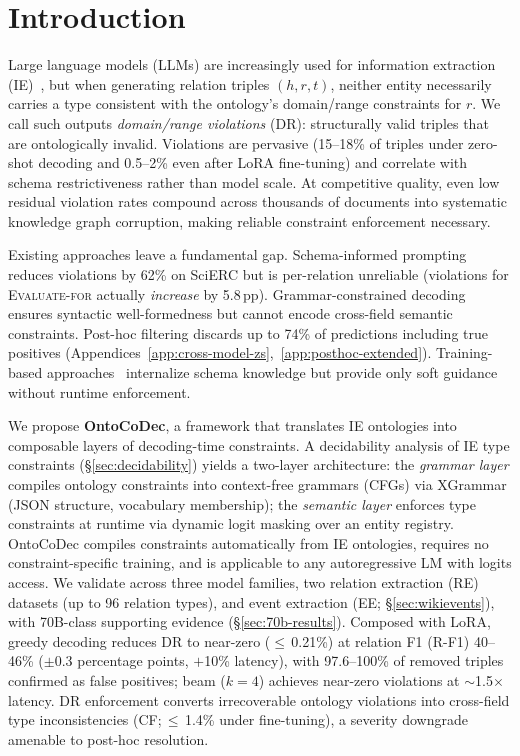 
\section{Introduction}
\label{sec:introduction}

Large language models (LLMs) are increasingly used for information extraction (IE)~\cite{li2023codeie,sainz2024gollie,wei2023zeroshot}, but when generating relation triples $(h, r, t)$, neither entity necessarily carries a type consistent with the ontology's domain/range constraints for $r$.
We call such outputs \emph{domain/range violations} (DR): structurally valid triples that are ontologically invalid.
Violations are pervasive (15--18\% of triples under zero-shot decoding and 0.5--2\% even after LoRA fine-tuning) and correlate with schema restrictiveness rather than model scale.
At competitive quality, even low residual violation rates compound across thousands of documents into systematic knowledge graph corruption, making reliable constraint enforcement necessary.

Existing approaches leave a fundamental gap.
Schema-informed prompting reduces violations by 62\% on SciERC but is per-relation unreliable (violations for \textsc{Evaluate-for} actually \emph{increase} by 5.8\,pp).
Grammar-constrained decoding~\cite{dong2025xgrammar,willard2023outlines,beurer-kellner2023lmql} ensures syntactic well-formedness but cannot encode cross-field semantic constraints.
Post-hoc filtering discards up to 74\% of predictions including true positives (Appendices~\ref{app:cross-model-zs},~\ref{app:posthoc-extended}).
Training-based approaches~\cite{sainz2024gollie,lu2022uie} internalize schema knowledge but provide only soft guidance without runtime enforcement.

We propose \textbf{OntoCoDec}, a framework that translates IE ontologies into composable layers of decoding-time constraints.
A decidability analysis of IE type constraints (\S\ref{sec:decidability}) yields a two-layer architecture: the \emph{grammar layer} compiles ontology constraints into context-free grammars (CFGs) via XGrammar (JSON structure, vocabulary membership); the \emph{semantic layer} enforces type constraints at runtime via dynamic logit masking over an entity registry.
OntoCoDec compiles constraints automatically from IE ontologies, requires no constraint-specific training, and is applicable to any autoregressive LM with logits access.
We validate across three model families, two relation extraction (RE) datasets (up to 96 relation types), and event extraction (EE; \S\ref{sec:wikievents}), with 70B-class supporting evidence (\S\ref{sec:70b-results}).
Composed with LoRA, greedy decoding reduces DR to near-zero ($\leq$\,0.21\%) at relation F1 (R-F1) 40--46\% ($\pm$0.3 percentage points, $+$10\% latency), with 97.6--100\% of removed triples confirmed as false positives; beam ($k{=}4$) achieves near-zero violations at ${\sim}$1.5$\times$ latency.
DR enforcement converts irrecoverable ontology violations into cross-field type inconsistencies (CF;\,$\leq$\,1.4\% under fine-tuning), a severity downgrade amenable to post-hoc resolution.

